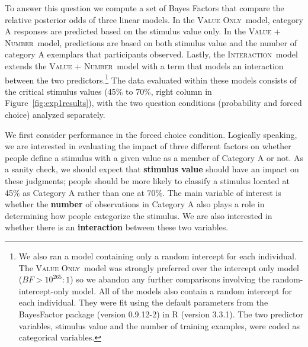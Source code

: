 \documentclass[doc,apacite]{apa6}
\newcommand{\valueonly}{\textsc{Value Only}}
\newcommand{\valuenumber}{\textsc{Value + Number}}
\newcommand{\interaction}{\textsc{Interaction}}
\begin{document}
To answer this question we compute a set of Bayes Factors that compare the relative posterior odds of three linear models.
In the \valueonly\ model, category A responses are predicted based
on the stimulus value only. In the \valuenumber\ model, predictions are based on
both stimulus value and the number of category A exemplars that participants
observed. Lastly, the \interaction\ model extends the \valuenumber\ model with a
term that models an interaction between the two predictors.\footnote{We also ran a model containing only a random intercept for each individual. The \valueonly\ model was strongly preferred over the intercept only model ($ BF > 10^{265} : 1 $) so we abandon any further comparisons involving the random-intercept-only model. All of the models also contain a random intercept for each individual. They were fit using the default parameters \cite{rouder2012default, liang2008mixtures} from the BayesFactor package (version 0.9.12-2) in R (version 3.3.1). The two predictor variables, stimulus value and the number of training examples, were coded as categorical variables.} 
The data evaluated within these models consists of the critical stimulus values (45\% to 70\%, right column in Figure~\ref{fig:exp1results}), with the two question conditions ({\sc probability} and {\sc forced choice}) analyzed separately.

We first consider performance in the {\sc forced choice} condition. Logically speaking, we are interested in evaluating the impact of three different factors on whether people define a stimulus with a given value as a member of Category A or not. As a sanity check, we should expect that {\bf stimulus value} should have an impact on these judgments; people should be more likely to classify a stimulus located at 45\% as Category A rather than one at 70\%. The main variable of interest is whether the {\bf number} of observations in Category A also plays a role in determining how people categorize the stimulus. We are also interested in whether there is an {\bf interaction} between these two variables.
\end{document}
